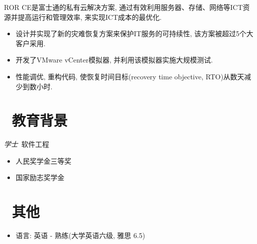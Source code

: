 \documentclass{resume}
\begin{document}
\begin{onehalfspacing}
ROR CE是富士通的私有云解决方案, 通过有效利用服务器、存储、网络等ICT资源并提高运行和管理效率, 来实现ICT成本的最优化.
\begin{itemize}
  \item 设计并实现了新的灾难恢复方案来保护IT服务的可持续性, 该方案被超过5个大客户采用.
  \item 开发了VMware vCenter模拟器, 并利用该模拟器实施大规模测试.
  \item 性能调优, 重构代码, 使恢复时间目标(recovery time objective, RTO)从数天减少到数小时.
\end{itemize}
\end{onehalfspacing}


\section{\faGraduationCap\  教育背景}
\textit{学士}\ 软件工程
\begin{itemize}
  \item 人民奖学金三等奖
  \item 国家励志奖学金
\end{itemize}


\section{\faInfo\ 其他}
\begin{itemize}[parsep=0.5ex]
  \item 语言: 英语 - 熟练(大学英语六级, 雅思 6.5)
\end{itemize}

%
%
\end{document}
